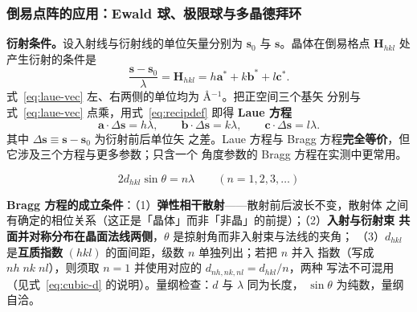 \subsubsection{倒易点阵的应用：Ewald 球、极限球与多晶德拜环}

\begin{principle}
\textbf{衍射条件。}设入射线与衍射线的单位矢量分别为 $\boldsymbol{s}_0$ 与
$\boldsymbol{s}$。晶体在倒易格点 $\boldsymbol{H}_{hkl}$ 处产生衍射的条件是
\begin{equation}
\frac{\boldsymbol{s}-\boldsymbol{s}_0}{\lambda}=\boldsymbol{H}_{hkl}
=h\boldsymbol{a}^{*}+k\boldsymbol{b}^{*}+l\boldsymbol{c}^{*}.
\label{eq:laue-vec}
\end{equation}
式~\eqref{eq:laue-vec} 左、右两侧的单位均为 $\unit{\angstrom^{-1}}$。把正空间三个基矢
分别与式~\eqref{eq:laue-vec} 点乘，用式~\eqref{eq:recipdef} 即得
\textbf{Laue 方程}
\begin{equation}
\boldsymbol{a}\cdot\Delta\boldsymbol{s}=h\lambda,\qquad
\boldsymbol{b}\cdot\Delta\boldsymbol{s}=k\lambda,\qquad
\boldsymbol{c}\cdot\Delta\boldsymbol{s}=l\lambda .
\label{eq:laue}
\end{equation}
其中 $\Delta\boldsymbol{s}\equiv\boldsymbol{s}-\boldsymbol{s}_0$ 为衍射前后单位矢
之差。Laue 方程与 Bragg 方程\textbf{完全等价}，但它涉及三个方程与更多参数；只含一个
角度参数的 Bragg 方程在实测中更常用。
\end{principle}

\begin{equation}
2d_{hkl}\sin\theta=n\lambda \qquad (n=1,2,3,\dots)
\label{eq:bragg-ch04}
\end{equation}
\begin{keycond}
\textbf{Bragg 方程的成立条件}：（1）\textbf{弹性相干散射}——散射前后波长不变，散射体
之间有确定的相位关系（这正是「晶体」而非「非晶」的前提）；（2）\textbf{入射与衍射束
共面并对称分布在晶面法线两侧}，$\theta$ 是掠射角而非入射束与法线的夹角；
（3）$d_{hkl}$ 是\textbf{互质指数} $(hkl)$ 的面间距，级数 $n$ 单独列出；若把 $n$ 并入
指数（写成 $nh\;nk\;nl$），则须取 $n=1$ 并使用对应的 $d_{nh,nk,nl}=d_{hkl}/n$，两种
写法不可混用（见式~\eqref{eq:cubic-d} 的说明）。量纲检查：$d$ 与 $\lambda$ 同为长度，
$\sin\theta$ 为纯数，量纲自洽。
\end{keycond}

